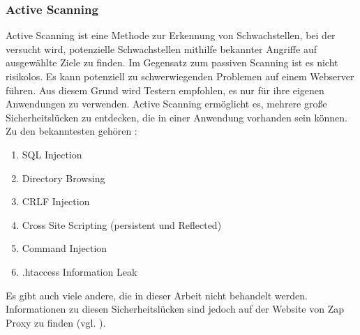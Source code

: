 \subsubsection{Active Scanning}

Active Scanning ist eine Methode zur Erkennung von Schwachstellen, bei
der versucht wird, potenzielle Schwachstellen mithilfe bekannter Angriffe
auf ausgewählte Ziele zu finden. Im Gegensatz zum passiven Scanning ist es
nicht risikolos. Es kann potenziell zu schwerwiegenden Problemen auf einem
Webserver führen. Aus diesem Grund wird Testern empfohlen, es nur für ihre
eigenen Anwendungen zu verwenden. Active Scanning ermöglicht es, mehrere
große Sicherheitslücken zu entdecken, die in einer Anwendung vorhanden
sein können. Zu den bekanntesten gehören :

\begin{enumerate}
    \item SQL Injection
    \item Directory Browsing
    \item CRLF Injection
    \item Cross Site Scripting (persistent und Reflected)
    \item Command Injection
    \item .htaccess Information Leak
\end{enumerate}

Es gibt auch viele andere, die in dieser Arbeit nicht behandelt werden.
Informationen zu diesen Sicherheitslücken sind jedoch auf der Website
von Zap Proxy zu finden (vgl. \cite{activ}).

